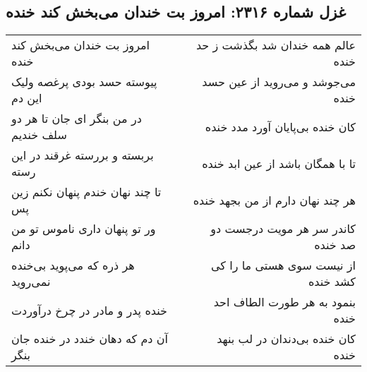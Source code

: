 \begin{center}
\section*{غزل شماره ۲۳۱۶: امروز بت خندان می‌بخش کند خنده}
\label{sec:2316}
\begin{longtable}{l p{0.5cm} r}
امروز بت خندان می‌بخش کند خنده
&&
عالم همه خندان شد بگذشت ز حد خنده
\\
پیوسته حسد بودی پرغصه ولیک این دم
&&
می‌جوشد و می‌روید از عین حسد خنده
\\
در من بنگر ای جان تا هر دو سلف خندیم
&&
کان خنده بی‌پایان آورد مدد خنده
\\
بربسته و بررسته غرقند در این رسته
&&
تا با همگان باشد از عین ابد خنده
\\
تا چند نهان خندم پنهان نکنم زین پس
&&
هر چند نهان دارم از من بجهد خنده
\\
ور تو پنهان داری ناموس تو من دانم
&&
کاندر سر هر مویت درجست دو صد خنده
\\
هر ذره که می‌پوید بی‌خنده نمی‌روید
&&
از نیست سوی هستی ما را کی کشد خنده
\\
خنده پدر و مادر در چرخ درآوردت
&&
بنمود به هر طورت الطاف احد خنده
\\
آن دم که دهان خندد در خنده جان بنگر
&&
کان خنده بی‌دندان در لب بنهد خنده
\\
\end{longtable}
\end{center}
